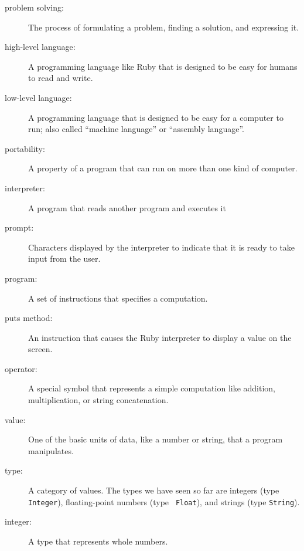 \documentclass[10pt]{book}
\begin{document}
\begin{description}

\item[problem solving:]  The process of formulating a problem, finding
a solution, and expressing it.

\item[high-level language:]  A programming language like Ruby that
is designed to be easy for humans to read and write.

\item[low-level language:]  A programming language that is designed
to be easy for a computer to run; also called ``machine language'' or
``assembly language''.

\item[portability:]  A property of a program that can run on more
than one kind of computer.

\item[interpreter:]  A program that reads another program and executes
it

\item[prompt:] Characters displayed by the interpreter to indicate
that it is ready to take input from the user.

\item[program:] A set of instructions that specifies a computation.

\item[puts method:]  An instruction that causes the Ruby
interpreter to display a value on the screen.

\item[operator:]  A special symbol that represents a simple computation like
addition, multiplication, or string concatenation.

\item[value:]  One of the basic units of data, like a number or string, 
that a program manipulates.

\item[type:] A category of values.  The types we have seen so far
are integers (type {\tt Integer}), floating-point numbers (type {\tt
Float}), and strings (type {\tt String}).

\item[integer:] A type that represents whole numbers.


\end{description}
\end{document}
